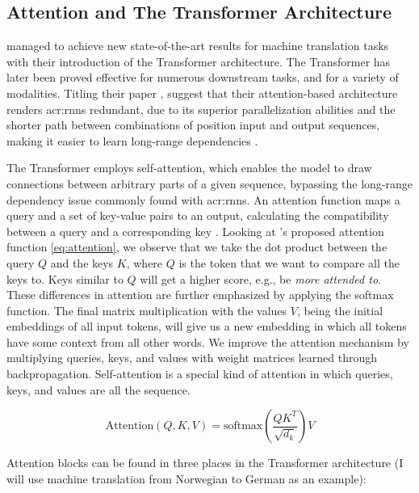 \subsection{Attention and The Transformer Architecture}\label{subsec:attention-and-transformers}

\cite{vaswaniAttentionAllYou2017} managed to achieve new state-of-the-art results for machine translation tasks with their introduction of the Transformer architecture. The Transformer has later been proved effective for numerous downstream tasks, and for a variety of modalities. Titling their paper , \citeauthor{vaswaniAttentionAllYou2017} suggest that their attention-based architecture renders \glspl{acr:rnn} redundant, due to its superior parallelization abilities and the shorter path between combinations of position input and output sequences, making it easier to learn long-range dependencies \citep[6]{vaswaniAttentionAllYou2017}.

The Transformer employs self-attention, which enables the model to draw connections between arbitrary parts of a given sequence, bypassing the long-range dependency issue commonly found with \glspl{acr:rnn}. An attention function maps a query and a set of key-value pairs to an output, calculating the compatibility between a query and a corresponding key \citep[3]{vaswaniAttentionAllYou2017}. Looking at \citeauthor{vaswaniAttentionAllYou2017}'s proposed attention function \eqref{eq:attention}, we observe that we take the dot product between the query $Q$ and the keys $K$, where $Q$ is the token that we want to compare all the keys to. Keys similar to $Q$ will get a higher score, e.g., be \textit{more attended to}. These differences in attention are further emphasized by applying the softmax function. The final matrix multiplication with the values $V$, being the initial embeddings of all input tokens, will give us a new embedding in which all tokens have some context from all other words. We improve the attention mechanism by multiplying queries, keys, and values with weight matrices learned through backpropagation. Self-attention is a special kind of attention in which queries, keys, and values are all the sequence.

\begin{equation}
    \text{Attention}(Q, K, V) = \text{softmax}\left(\frac{QK^T}{\sqrt{d_k}}\right)V
    \label{eq:attention}
\end{equation}

Attention blocks can be found in three places in the Transformer architecture \citep[5]{vaswaniAttentionAllYou2017} (I will use machine translation from Norwegian to German as an example):

